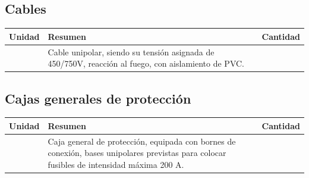 \documentclass[../main.tex]{subfiles}
\begin{document}
\subsection{Cables}
\begin{table}[H]
    \centering
    \begin{tabular}{c p{11.5cm} c}
        Unidad & Resumen & Cantidad  \\ \hline
         & Cable unipolar, siendo su tensión asignada de 450/750V, reacción al fuego, con aislamiento de PVC. &
    \end{tabular}
\end{table}

\subsection{Cajas generales de protección}
\begin{table}[H]
    \centering
    \begin{tabular}{c p{11.5cm} c}
        Unidad & Resumen & Cantidad  \\ \hline
         & Caja general de protección, equipada con bornes de conexión, bases unipolares previstas para colocar fusibles de intensidad máxima 200 A. &
    \end{tabular}
\end{table}

\end{document}
